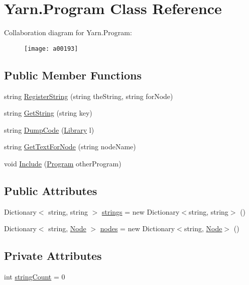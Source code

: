 \hypertarget{a00067}{\section{Yarn.\-Program Class Reference}
\label{a00067}
}


Collaboration diagram for Yarn.\-Program\-:
\nopagebreak
\begin{figure}[H]
\begin{center}
\leavevmode
\texttt{[image: a00193]}
\end{center}
\end{figure}
\subsection*{Public Member Functions}
\begin{DoxyCompactItemize}
\item 
string \hyperlink{a00067_a13c9b747b37e404e2d0713468b2a78ff}{Register\-String} (string the\-String, string for\-Node)
\item 
string \hyperlink{a00067_a14737b93594c4aab25c59cb0a3c918f7}{Get\-String} (string key)
\item 
string \hyperlink{a00067_a2f5bb468ce53eb7bbe647e3c11ddbb61}{Dump\-Code} (\hyperlink{a00049}{Library} l)
\item 
string \hyperlink{a00067_aad8029f37832ff1985fad6a31e51afd8}{Get\-Text\-For\-Node} (string node\-Name)
\item 
void \hyperlink{a00067_afd3385ca1f7589b3b9dae3646e4fee84}{Include} (\hyperlink{a00067}{Program} other\-Program)
\end{DoxyCompactItemize}
\subsection*{Public Attributes}
\begin{DoxyCompactItemize}
\item 
Dictionary$<$ string, string $>$ \hyperlink{a00067_a91518fda7e41bf573f66c6946dd3b4cb}{strings} = new Dictionary$<$string, string$>$ ()
\item 
Dictionary$<$ string, \hyperlink{a00026_a00160}{Node} $>$ \hyperlink{a00067_a3f4928a577c88263ad016be259b175c4}{nodes} = new Dictionary$<$string, \hyperlink{a00026_a00160}{Node}$>$ ()
\end{DoxyCompactItemize}
\subsection*{Private Attributes}
\begin{DoxyCompactItemize}
\item 
int \hyperlink{a00067_a8ef1d10094ef00311aade6715ba78ec7}{string\-Count} = 0
\end{DoxyCompactItemize}


